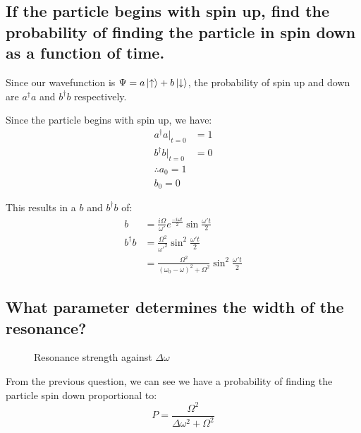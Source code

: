 \documentclass[a4paper]{scrartcl}
\begin{document}
\subsection{If the particle begins with spin up, find the probability of finding the particle in spin down as a function of time.}
Since our wavefunction is \(\Psi = a \ket{\uparrow} + b \ket{\downarrow}\), the probability of spin up and down are \(a^{\dag} a\) and \(b^{\dag} b\) respectively.

Since the particle begins with spin up, we have:
\begin{align*}
    a^{\dag} a \big|_{t = 0} &= 1 \\
    b^{\dag} b \big|_{t = 0} &= 0 \\
    \therefore a_0 = 1 \\
    b_0 = 0
\end{align*}

This results in a \(b\) and \(b^{\dag} b\) of:
\begin{align*}
    b &= \frac{i \Omega}{\omega'} e^{\frac{-i \omega t}{2}} \sin \frac{\omega' t}{2} \\
    b^{\dag} b &= \frac{\Omega^2}{\omega'^2} \sin^2 \frac{\omega' t}{2} \\
    &= \frac{\Omega^2}{(\omega_0 - \omega)^2 + \Omega^2} \sin^2 \frac{\omega' t}{2}
\end{align*}

\subsection{What parameter determines the width of the resonance?}
\begin{figure}
    \centering
    \caption{Resonance strength against \(\Delta\omega\)}
    \label{fig:resonance}
\end{figure}

From the previous question, we can see we have a probability of finding the particle spin down proportional to:
\[P = \frac{\Omega^2}{\Delta\omega^2 + \Omega^2}\]
\end{document}
